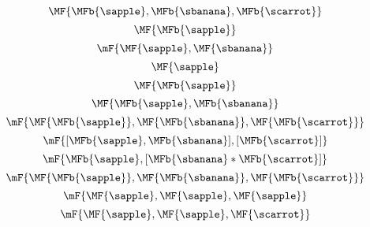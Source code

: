 {\begin{forslides}
\begin{equation}
            \label{eq:fruit-sum-4}
            \MF{\MFb{\sapple}   , \MFb{\sbanana} , \MFb{\scarrot}}
        \end{equation}
        \begin{equation}
            \label{eq:fruit-sum-5}
            \MF{\MFb{\sapple}}
        \end{equation}
        \begin{equation}
            \label{eq:fruit-sum-6}
            \mF {\MF{\sapple}  ,  \MF{\sbanana}}
        \end{equation}
        \begin{equation}
            \label{eq:fruit-sum-6a}
            \MF{\sapple}
        \end{equation}
        \begin{equation}
            \label{eq:fruit-sum-6b}
            \MF{\MFb{\sapple}}
        \end{equation}
        \begin{equation}
            \label{eq:fruit-sum-6-bis}
            \MF{\MFb{\sapple}  , \MFb{\sbanana}}
        \end{equation}
        \begin{equation}
            \label{eq:fruit-sum-7}
            \mF {\MF{\MFb{\sapple}} , \MF{\MFb{\sbanana}}  , \MF{\MFb{\scarrot}}}
        \end{equation}
        \begin{equation}
            \label{eq:fruit-sum-7-bis}
            \mF{[\MFb{\sapple}  , \MFb{\sbanana}] ,  [\MFb{\scarrot}]}
        \end{equation}
        \begin{equation}
            \label{eq:fruit-sum-8}
            \mF{\MFb{\sapple}   , [\MFb{\sbanana}  * \MFb{\scarrot}]}
        \end{equation}
        \begin{equation}
            \label{eq:fruit-sum-9}
            \mF{\MF{\MFb{\sapple}}  , \MF{\MFb{\sbanana}} ,  \MF{\MFb{\scarrot}}}
        \end{equation}
        \begin{equation}
            \label{eq:fruit-sum-10}
            \mF{\MF{\sapple}   ,  \MF{\sapple}  ,  \MF{\sapple}}
        \end{equation}
        \begin{equation}
            \label{eq:fruit-sum-11}
            \mF{\MF{\sapple}   , \MF{\sapple}  ,\MF{\scarrot}}

\end{equation}
\end{forslides}}

